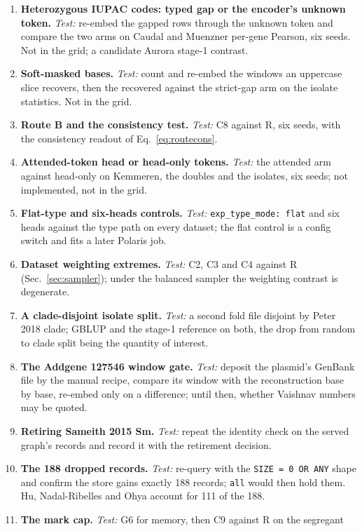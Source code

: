 \begin{enumerate}[leftmargin=*,itemsep=3pt]
\item \textbf{Heterozygous IUPAC codes: typed gap or the encoder's unknown token.} \emph{Test:}
re-embed the gapped rows through the unknown token and compare the two arms on Caudal and
Muenzner per-gene Pearson, six seeds. Not in the grid; a candidate Aurora stage-1 contrast.
\item \textbf{Soft-masked bases.} \emph{Test:} count and re-embed the windows an uppercase slice
recovers, then the recovered against the strict-gap arm on the isolate statistics. Not in the
grid.
\item \textbf{Route B and the consistency test.} \emph{Test:} C8 against R, six seeds, with the
consistency readout of Eq.~\ref{eq:routecons}.
\item \textbf{Attended-token head or head-only tokens.} \emph{Test:} the attended arm against
head-only on Kemmeren, the doubles and the isolates, six seeds; not implemented, not in the grid.
\item \textbf{Flat-type and six-heads controls.} \emph{Test:} \texttt{exp\_type\_mode: flat} and
six heads against the type path on every dataset; the flat control is a config switch and fits
a later Polaris job.
\item \textbf{Dataset weighting extremes.} \emph{Test:} C2, C3 and C4 against R
(Sec.~\ref{sec:sampler}); under the balanced sampler the weighting contrast is degenerate.
\item \textbf{A clade-disjoint isolate split.} \emph{Test:} a second fold file disjoint by Peter
2018 clade; GBLUP and the stage-1 reference on both, the drop from random to clade split being
the quantity of interest.
\item \textbf{The Addgene 127546 window gate.} \emph{Test:} deposit the plasmid's GenBank file by
the manual recipe, compare its window with the reconstruction base by base, re-embed only on a
difference; until then, whether Vaishnav numbers may be quoted.
\item \textbf{Retiring Sameith 2015 Sm.} \emph{Test:} repeat the identity check on the served
graph's records and record it with the retirement decision.
\item \textbf{The 188 dropped records.} \emph{Test:} re-query with the \texttt{SIZE = 0 OR ANY}
shape and confirm the store gains exactly 188 records; \texttt{all} would then hold them. Hu,
Nadal-Ribelles and Ohya account for 111 of the 188.
\item \textbf{The mark cap.} \emph{Test:} G6 for memory, then C9 against R on the segregant

\end{enumerate}
